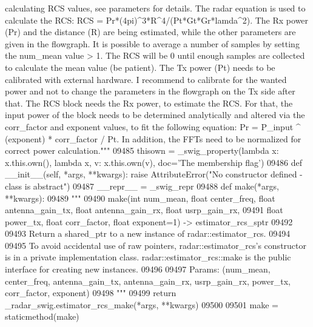 \begin{DoxyCode}
{{{{{{{{{{{{{{{{{{{{{{{{{{{{{{{{       calculating RCS values, see parameters for details. The radar equation is used to calculate the RCS: RCS =
       Pr*(4pi)^3*R^4/(Pt*Gt*Gr*lamda^2). The Rx power (Pr) and the distance (R) are being estimated, while the
       other parameters are given in the flowgraph. It is possible to average a number of samples by setting the
       num\_mean value > 1. The RCS will be 0 until enough samples are collected to calculate the mean value (be patient).
       The Tx power (Pt) needs to be calibrated with external hardware. I recommend to calibrate for the wanted
       power and not to change the parameters in the flowgraph on the Tx side after that. The RCS block needs the Rx
       power, to estimate the RCS. For that, the input power of the block needs to be determined analytically and
       altered via the corr\_factor and exponent values, to fit the following equation: Pr = P\_input ^ (exponent) *
       corr\_factor / Pt. In addition, the FFTs need to be normalized for correct power calculation."""}
09485     thisown = _swig_property(\textcolor{keyword}{lambda} x: x.this.own(), \textcolor{keyword}{lambda} x, v: x.this.own(v), doc=\textcolor{stringliteral}{'The membership flag'})
09486     \textcolor{keyword}{def }__init__(self, *args, **kwargs): \textcolor{keywordflow}{raise} AttributeError(\textcolor{stringliteral}{"No constructor defined - class is abstract"})
09487     \_\_repr\_\_ = \_swig\_repr
09488     \textcolor{keyword}{def }make(*args, **kwargs):
09489         \textcolor{stringliteral}{"""}
09490 \textcolor{stringliteral}{        make(int num\_mean, float center\_freq, float antenna\_gain\_tx, float antenna\_gain\_rx, float
       usrp\_gain\_rx, }
09491 \textcolor{stringliteral}{            float power\_tx, float corr\_factor, float exponent=1) -> estimator\_rcs\_sptr}
09492 \textcolor{stringliteral}{}
09493 \textcolor{stringliteral}{        Return a shared\_ptr to a new instance of radar::estimator\_rcs.}
09494 \textcolor{stringliteral}{}
09495 \textcolor{stringliteral}{        To avoid accidental use of raw pointers, radar::estimator\_rcs's constructor is in a private
       implementation class. radar::estimator\_rcs::make is the public interface for creating new instances.}
09496 \textcolor{stringliteral}{}
09497 \textcolor{stringliteral}{        Params: (num\_mean, center\_freq, antenna\_gain\_tx, antenna\_gain\_rx, usrp\_gain\_rx, power\_tx,
       corr\_factor, exponent)}
09498 \textcolor{stringliteral}{        """}
09499         \textcolor{keywordflow}{return} \_radar\_swig.estimator\_rcs\_make(*args, **kwargs)
09500 
09501     make = staticmethod(make)
}}}}}}}}}}}}}}}}}}}}}}}}}}}}}}}
\end{DoxyCode}
